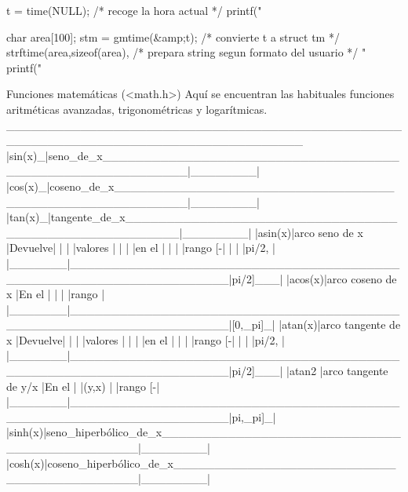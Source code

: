     t = time(NULL);             /* recoge la hora actual */
    printf("%

    char area[100];
    stm = gmtime(&amp;t);           /* convierte t a struct tm */
    strftime(area,sizeof(area), /* prepara string segun formato del usuario */
        "%
    printf("%

Funciones matemáticas (<math.h>)
Aquí se encuentran las habituales funciones aritméticas avanzadas,
trigonométricas y logarítmicas.
 ____________________________________________________________________________________
|sin(x)_|seno_de_x__________________________________________________________|________|
|cos(x)_|coseno_de_x________________________________________________________|________|
|tan(x)_|tangente_de_x______________________________________________________|________|
|asin(x)|arco seno de x                                                     |Devuelve|
|       |                                                                   |valores |
|       |                                                                   |en el   |
|       |                                                                   |rango [-|
|       |                                                                   |pi/2,   |
|_______|___________________________________________________________________|pi/2]___|
|acos(x)|arco coseno de x                                                   |En el   |
|       |                                                                   |rango   |
|_______|___________________________________________________________________|[0,_pi]_|
|atan(x)|arco tangente de x                                                 |Devuelve|
|       |                                                                   |valores |
|       |                                                                   |en el   |
|       |                                                                   |rango [-|
|       |                                                                   |pi/2,   |
|_______|___________________________________________________________________|pi/2]___|
|atan2  |arco tangente de y/x                                               |En el   |
|(y,x)  |                                                                   |rango [-|
|_______|___________________________________________________________________|pi,_pi]_|
|sinh(x)|seno_hiperbólico_de_x_____________________________________________|________|
|cosh(x)|coseno_hiperbólico_de_x___________________________________________|________|
